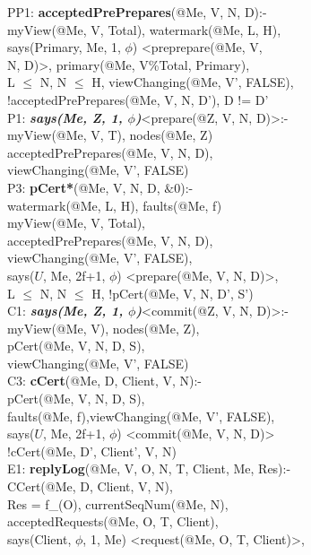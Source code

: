 \begin{code}
PP1: \textbf{acceptedPrePrepares}(@Me, V, N, D):-\\
\> myView(@Me, V, Total), watermark(@Me, L, H), \\
\> says(Primary, Me, 1, $\phi$) <preprepare(@Me, V,\\
\>  N, D)>, primary(@Me, V\%Total, Primary),\\
\> L $\leq$ N, N $\leq$ H, viewChanging(@Me, V', FALSE),\\
\> !acceptedPrePrepares(@Me, V, N, D'), D != D'\\
P1: \textbf{\textit{says(Me, Z, 1, $\phi$)}}<prepare(@Z, V, N, D)>:-\\
\> myView(@Me, V, T), nodes(@Me, Z)\\
\> acceptedPrePrepares(@Me, V, N, D),\\
\> viewChanging(@Me, V', FALSE)\\
P3: \textbf{pCert*}(@Me, V, N, D, $\&0$):- \\
\> watermark(@Me, L, H), faults(@Me, f)\\
\> myView(@Me, V, Total), \\
\> acceptedPrePrepares(@Me, V, N, D), \\
\> viewChanging(@Me, V', FALSE),\\
\> says($U$, Me, 2f+1, $\phi$) <prepare(@Me, V, N, D)>, \\
\> L $\leq$ N, N $\leq$ H, !pCert(@Me, V, N, D', S')\\
C1: \textbf{\textit{says(Me, Z, 1, $\phi$)}}<commit(@Z, V, N, D)>:- \\
\> myView(@Me, V), nodes(@Me, Z), \\
\> pCert(@Me, V, N, D, S), \\
\> viewChanging(@Me, V', FALSE)\\
C3: \textbf{cCert}(@Me, D, Client, V, N):-\\
\> pCert(@Me, V, N, D, S), \\
\> faults(@Me, f),viewChanging(@Me, V', FALSE), \\
\> says($U$, Me, 2f+1, $\phi$) <commit(@Me, V, N, D)>\\
\> !cCert(@Me, D', Client', V, N)\\
E1: \textbf{replyLog}(@Me, V, O, N, T, Client, Me, Res):-\\
\> CCert(@Me, D, Client, V, N),\\
\> Res = f\_(O), currentSeqNum(@Me, N),\\
\> acceptedRequests(@Me, O, T, Client),\\
\> says(Client, $\phi$, 1, Me) <request(@Me, O, T, Client)>, \\

\end{code}
